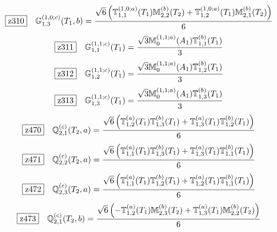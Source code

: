 \documentclass[fleqn,10pt,landscape]{jsarticle}
\begin{document}
\begin{dmath*}
\hspace*{3mm}\fbox{z310}\quad \mathbb{G}_{1,3}^{(1,0;c)}(T_{1},b)=\frac{\sqrt{6} \left(\mathbb{T}_{1,1}^{(1,0;a)}(T_{1}) \mathbb{M}_{2,2}^{(b)}(T_{2}) + \mathbb{T}_{1,2}^{(1,0;a)}(T_{1}) \mathbb{M}_{2,1}^{(b)}(T_{2})\right)}{6}
\end{dmath*}
\begin{dmath*}
\hspace*{3mm}\fbox{z311}\quad \mathbb{G}_{1,1}^{(1,1;c)}(T_{1})=\frac{\sqrt{3} \mathbb{M}_{0}^{(1,1;a)}(A_{1}) \mathbb{T}_{1,1}^{(b)}(T_{1})}{3}
\end{dmath*}
\begin{dmath*}
\hspace*{3mm}\fbox{z312}\quad \mathbb{G}_{1,2}^{(1,1;c)}(T_{1})=\frac{\sqrt{3} \mathbb{M}_{0}^{(1,1;a)}(A_{1}) \mathbb{T}_{1,2}^{(b)}(T_{1})}{3}
\end{dmath*}
\begin{dmath*}
\hspace*{3mm}\fbox{z313}\quad \mathbb{G}_{1,3}^{(1,1;c)}(T_{1})=\frac{\sqrt{3} \mathbb{M}_{0}^{(1,1;a)}(A_{1}) \mathbb{T}_{1,3}^{(b)}(T_{1})}{3}
\end{dmath*}
\begin{dmath*}
\hspace*{3mm}\fbox{z470}\quad \mathbb{Q}_{2,1}^{(c)}(T_{2},a)=\frac{\sqrt{6} \left(\mathbb{T}_{1,2}^{(a)}(T_{1}) \mathbb{T}_{1,3}^{(b)}(T_{1}) + \mathbb{T}_{1,3}^{(a)}(T_{1}) \mathbb{T}_{1,2}^{(b)}(T_{1})\right)}{6}
\end{dmath*}
\begin{dmath*}
\hspace*{3mm}\fbox{z471}\quad \mathbb{Q}_{2,2}^{(c)}(T_{2},a)=\frac{\sqrt{6} \left(\mathbb{T}_{1,1}^{(a)}(T_{1}) \mathbb{T}_{1,3}^{(b)}(T_{1}) + \mathbb{T}_{1,3}^{(a)}(T_{1}) \mathbb{T}_{1,1}^{(b)}(T_{1})\right)}{6}
\end{dmath*}
\begin{dmath*}
\hspace*{3mm}\fbox{z472}\quad \mathbb{Q}_{2,3}^{(c)}(T_{2},a)=\frac{\sqrt{6} \left(\mathbb{T}_{1,1}^{(a)}(T_{1}) \mathbb{T}_{1,2}^{(b)}(T_{1}) + \mathbb{T}_{1,2}^{(a)}(T_{1}) \mathbb{T}_{1,1}^{(b)}(T_{1})\right)}{6}
\end{dmath*}
\begin{dmath*}
\hspace*{3mm}\fbox{z473}\quad \mathbb{Q}_{2,1}^{(c)}(T_{2},b)=\frac{\sqrt{6} \left(- \mathbb{T}_{1,2}^{(a)}(T_{1}) \mathbb{M}_{2,3}^{(b)}(T_{2}) + \mathbb{T}_{1,3}^{(a)}(T_{1}) \mathbb{M}_{2,2}^{(b)}(T_{2})\right)}{6}
\end{dmath*}
\end{document}
